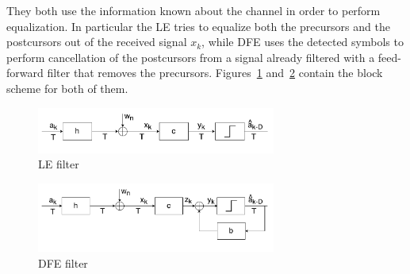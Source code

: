 \documentclass[10pt]{article}
\begin{document}
They both use the information known about the channel in order to perform equalization. In particular the LE tries to equalize both the precursors and the postcursors out of the received signal $x_k$, while DFE uses the detected symbols to perform cancellation of the postcursors from a signal already filtered with a feed-forward filter that removes the precursors. Figures~\ref{fig:LE} and~\ref{fig:DFE} contain the block scheme for both of them. 
\begin{figure}[h!]
	\centering
	\includegraphics[width = 0.7\textwidth]{LE}
	\caption{LE filter}
	\label{fig:LE}
\end{figure}

\begin{figure}[h!]
	\centering
	\includegraphics[width=0.7\textwidth]{DFE}
	\caption{DFE filter}
	\label{fig:DFE}
\end{figure}
\end{document}
